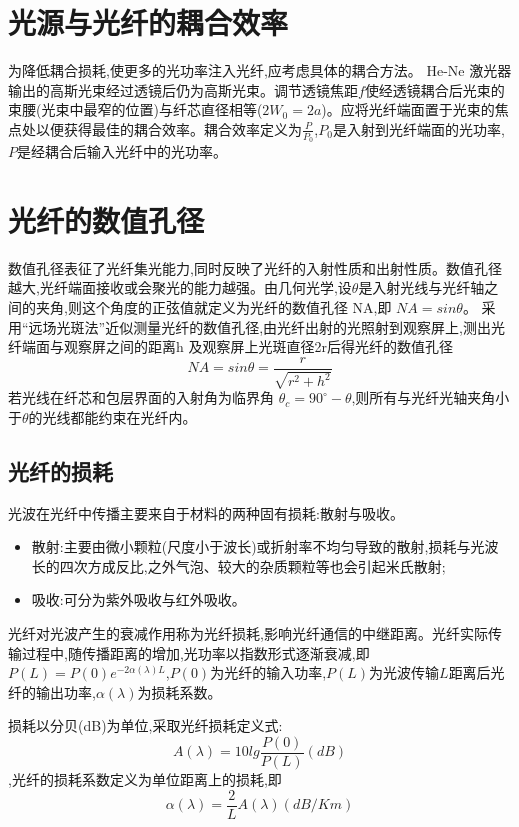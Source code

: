 \documentclass[12pt, a4paper]{article}
\begin{document}
\section{光源与光纤的耦合效率}
为降低耦合损耗,使更多的光功率注入光纤,应考虑具体的耦合方法。
He-Ne 激光器输出的高斯光束经过透镜后仍为高斯光束。调节透镜焦距$f$使经透镜耦合后光束的束腰(光束中最窄的位置)与纤芯直径相等($2W_0=2a$)。应将光纤端面置于光束的焦点处以便获得最佳的耦合效率。耦合效率定义为$\frac{P}{P_0}$,$P_0$是入射到光纤端面的光功率,$P$是经耦合后输入光纤中的光功率。

\section{光纤的数值孔径}
数值孔径表征了光纤集光能力,同时反映了光纤的入射性质和出射性质。数值孔径越大,光纤端面接收或会聚光的能力越强。由几何光学,设$\theta$是入射光线与光纤轴之间的夹角,则这个角度的正弦值就定义为光纤的数值孔径 NA,即 $NA = sin\theta$。
采用“远场光斑法”近似测量光纤的数值孔径,由光纤出射的光照射到观察屏上,测出光纤端面与观察屏之间的距离h 及观察屏上光斑直径2r后得光纤的数值孔径
\begin{equation}
    NA=sin\theta = \frac{r}{\sqrt{r^2+h^2}}
\end{equation}
若光线在纤芯和包层界面的入射角为临界角 $\theta_c=90^\circ-\theta$,则所有与光纤光轴夹角小于$\theta$的光线都能约束在光纤内。

\subsection{光纤的损耗}
光波在光纤中传播主要来自于材料的两种固有损耗:散射与吸收。
\begin{itemize}
    \item 散射:主要由微小颗粒(尺度小于波长)或折射率不均匀导致的散射,损耗与光波长的四次方成反比,之外气泡、较大的杂质颗粒等也会引起米氏散射;
    \item 吸收:可分为紫外吸收与红外吸收。
\end{itemize}
光纤对光波产生的衰减作用称为光纤损耗,影响光纤通信的中继距离。光纤实际传输过程中,随传播距离的增加,光功率以指数形式逐渐衰减,即$P(L)=P(0)e^{-2\alpha(\lambda)L}$,$P(0)$为光纤的输入功率,$P(L)$为光波传输$L$距离后光纤的输出功率,$\alpha(\lambda)$为损耗系数。

损耗以分贝(dB)为单位,采取光纤损耗定义式:
\begin{equation}
    A(\lambda) = 10lg\frac{P(0)}{P(L)} (dB)
\end{equation}
,光纤的损耗系数定义为单位距离上的损耗,即
\begin{equation}
  \alpha(\lambda) = \frac{2}{L}A(\lambda) (dB/Km)
\end{equation}
\end{document}
